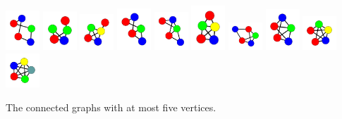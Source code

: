 \documentclass[openany]{tufte-book} %
\theoremstyle{plain}
\begin{document}
\begin{marginfigure}
		\includegraphics[width=0.5in]{graphs/all/0110011010.pdf}
		\includegraphics[width=0.5in]{graphs/all/0111001110.pdf}
		\includegraphics[width=0.5in]{graphs/all/0111001111.pdf}
		\includegraphics[width=0.5in]{graphs/all/0111011010.pdf}
		\includegraphics[width=0.5in]{graphs/all/0111011011.pdf}
		\includegraphics[width=0.5in]{graphs/all/0111011111.pdf}
		\includegraphics[width=0.5in]{graphs/all/0111111010.pdf}
		\includegraphics[width=0.5in]{graphs/all/0111111011.pdf}
		\includegraphics[width=0.5in]{graphs/all/0111111111.pdf}
		\includegraphics[width=0.5in]{graphs/all/1111111111.pdf}
		\caption{The connected graphs with at most five vertices.}
		\label{fig:SmallGraphs}
\end{marginfigure}
\end{document}
